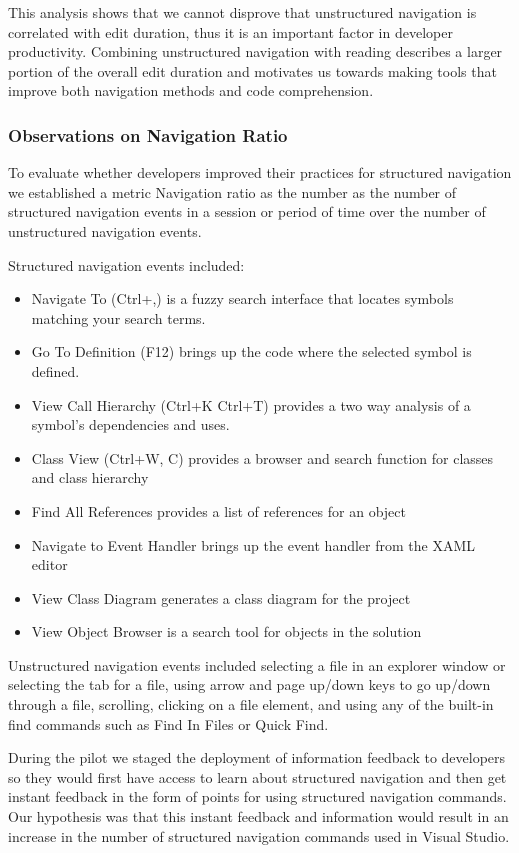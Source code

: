 \documentclass{sig-alternate}
\begin{document}
This analysis shows that we cannot disprove that unstructured navigation is correlated with edit duration, thus it is an important factor in developer productivity.  Combining unstructured navigation with reading describes a larger portion of the overall edit duration and motivates us towards making tools that improve both navigation methods and code comprehension.  

\subsubsection{Observations on Navigation Ratio}

To evaluate whether developers improved their practices for structured navigation we established a metric Navigation ratio as the number as the number of structured navigation events in a session or period of time over the number of unstructured navigation events.  

Structured navigation events included: 
\begin{itemize}
\item Navigate To (Ctrl+,) is a fuzzy search interface that locates symbols matching your search terms.
\item Go To Definition (F12) brings up the code where the selected symbol is defined. 
\item View Call Hierarchy (Ctrl+K Ctrl+T) provides a two way analysis of a symbol's dependencies and uses. 
\item Class View (Ctrl+W, C) provides a browser and search function for classes and class hierarchy
\item Find All References provides a list of references for an object
\item Navigate to Event Handler brings up the event handler from the XAML editor
\item View Class Diagram generates a class diagram for the project
\item View Object Browser is a search tool for objects in the solution
\end{itemize}

Unstructured navigation events included selecting a file in an explorer window or selecting the tab for a file, using arrow and page up/down keys to go up/down through a file, scrolling, clicking on a file element, and using any of the built-in find commands such as Find In Files or Quick Find.

During the pilot we staged the deployment of information feedback to developers so they would first have access to learn about structured navigation and then get instant feedback in the form of points for using structured navigation commands.  Our hypothesis was that this instant feedback and information would result in an increase in the number of structured navigation commands used in Visual Studio.
\end{document}

